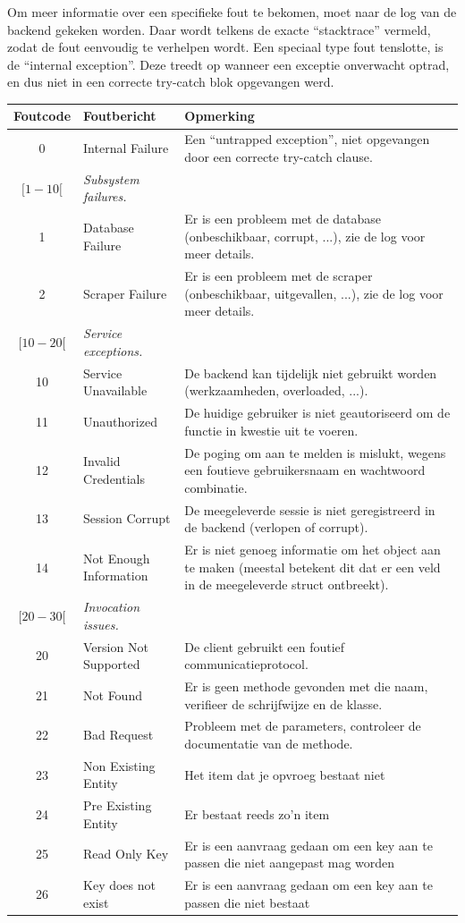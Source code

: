Om meer informatie over een specifieke fout te bekomen, moet naar de log van de backend gekeken worden. Daar wordt telkens de exacte ``stacktrace'' vermeld, zodat de fout eenvoudig te verhelpen wordt. Een speciaal type fout tenslotte, is de ``internal exception''. Deze treedt op wanneer een exceptie onverwacht optrad, en dus niet in een correcte try-catch blok opgevangen werd.

\begin{table}
\begin{tabular}{| c p{4cm} p{7cm} |}
	\hline
	Foutcode & Foutbericht & Opmerking \\
	\hline
	
	0 & Internal Failure & Een ``untrapped exception'', niet opgevangen door een correcte try-catch clause. \\
	\hline
	
	$[1-10[$ & \emph{Subsystem failures.} & \\
	1 & Database Failure & Er is een probleem met de database (onbeschikbaar, corrupt, ...), zie de log voor meer details. \\
	2 & Scraper Failure & Er is een probleem met de scraper (onbeschikbaar, uitgevallen, ...), zie de log voor meer details. \\
	\hline
	
	$[10-20[$ & \emph{Service exceptions.} & \\
	10 & Service Unavailable & De backend kan tijdelijk niet gebruikt worden (werkzaamheden, overloaded, ...). \\
	11 & Unauthorized & De huidige gebruiker is niet geautoriseerd om de functie in kwestie uit te voeren. \\
	12 & Invalid Credentials & De poging om aan te melden is mislukt, wegens een foutieve gebruikersnaam en wachtwoord combinatie. \\
	13 & Session Corrupt & De meegeleverde sessie is niet geregistreerd in de backend (verlopen of corrupt). \\
	14 & Not Enough Information & Er is niet genoeg informatie om het object aan te maken (meestal betekent dit dat er een veld in de meegeleverde struct ontbreekt). \\
	\hline
	
	$[20-30[$ & \emph{Invocation issues.} & \\
	20 & Version Not Supported & De client gebruikt een foutief communicatieprotocol. \\
	21 & Not Found & Er is geen methode gevonden met die naam, verifieer de schrijfwijze en de klasse. \\
	22 & Bad Request & Probleem met de parameters, controleer de documentatie van de methode. \\
	23 & Non Existing Entity & Het item dat je opvroeg bestaat niet \\
	24 & Pre Existing Entity & Er bestaat reeds zo'n item \\
	25 & Read Only Key & Er is een aanvraag gedaan om een key aan te passen die niet aangepast mag worden \\
	26 & Key does not exist & Er is een aanvraag gedaan om een key aan te passen die niet bestaat \\
	\hline


\end{tabular}
\end{table}
